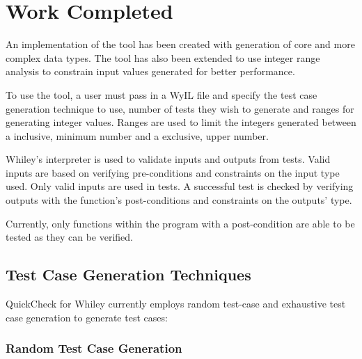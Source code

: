 \chapter{Work Completed}\label{chapter:work}



An implementation of the tool has been created with generation of core and more complex data types. The tool has also been extended to use integer range analysis to constrain input values generated for better performance.

To use the tool, a user must pass in a WyIL file and specify the test case generation technique to use, number of tests they wish to generate and ranges for generating integer values. Ranges are used to limit the integers generated between a inclusive, minimum number and a exclusive, upper number.

Whiley's interpreter is used to validate inputs and outputs from tests. Valid inputs are based on verifying pre-conditions and constraints on the input type used. Only valid inputs are used in tests. A successful test is checked by verifying outputs with the function's post-conditions and constraints on the outputs' type.


Currently, only functions within the program with a post-condition are able to be tested as they can be verified.

\section{Test Case Generation Techniques}

QuickCheck for Whiley currently employs random test-case and exhaustive test case generation to generate test cases: 

\subsection{Random Test Case Generation}

